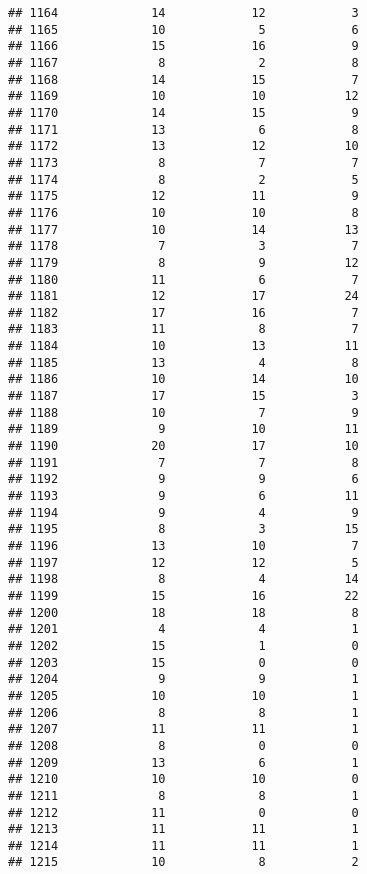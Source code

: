 \documentclass[
]{article}
\begin{document}
\begin{verbatim}
## 1164             14            12            3
## 1165             10             5            6
## 1166             15            16            9
## 1167              8             2            8
## 1168             14            15            7
## 1169             10            10           12
## 1170             14            15            9
## 1171             13             6            8
## 1172             13            12           10
## 1173              8             7            7
## 1174              8             2            5
## 1175             12            11            9
## 1176             10            10            8
## 1177             10            14           13
## 1178              7             3            7
## 1179              8             9           12
## 1180             11             6            7
## 1181             12            17           24
## 1182             17            16            7
## 1183             11             8            7
## 1184             10            13           11
## 1185             13             4            8
## 1186             10            14           10
## 1187             17            15            3
## 1188             10             7            9
## 1189              9            10           11
## 1190             20            17           10
## 1191              7             7            8
## 1192              9             9            6
## 1193              9             6           11
## 1194              9             4            9
## 1195              8             3           15
## 1196             13            10            7
## 1197             12            12            5
## 1198              8             4           14
## 1199             15            16           22
## 1200             18            18            8
## 1201              4             4            1
## 1202             15             1            0
## 1203             15             0            0
## 1204              9             9            1
## 1205             10            10            1
## 1206              8             8            1
## 1207             11            11            1
## 1208              8             0            0
## 1209             13             6            1
## 1210             10            10            0
## 1211              8             8            1
## 1212             11             0            0
## 1213             11            11            1
## 1214             11            11            1
## 1215             10             8            2

\end{verbatim}
\end{document}
